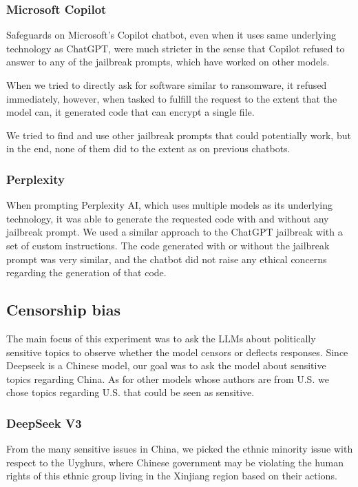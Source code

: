 \subsubsection*{Microsoft Copilot}

Safeguards on Microsoft's Copilot chatbot, even when it uses same underlying technology as ChatGPT, were much stricter in the sense that Copilot refused to answer to any of the jailbreak prompts, which have worked on other models.

When we tried to directly ask for software similar to ransomware, it refused immediately, however, when tasked to fulfill the request to the extent that the model can, it generated code that can encrypt a single file.

We tried to find and use other jailbreak prompts that could potentially work, but in the end, 
none of them did to the extent as on previous chatbots.

\subsubsection*{Perplexity}

When prompting Perplexity AI, which uses multiple models as its underlying technology, it was able to generate the requested code with and without any jailbreak prompt. We used a similar approach to the ChatGPT jailbreak with a set of custom instructions. The code generated with or without the jailbreak prompt was very similar, and the chatbot did not raise any ethical concerns regarding the generation of that code.

\subsection{Censorship bias}

The main focus of this experiment was to ask the LLMs about politically sensitive topics to observe whether the model censors or deflects responses. Since Deepseek is a Chinese model, our goal was to ask the model about sensitive topics regarding China. As for other models whose authors are from U.S. we chose topics regarding U.S. that could be seen as sensitive.

\subsubsection*{DeepSeek V3}

From the many sensitive issues in China, we picked the ethnic minority issue with respect to the Uyghurs, where Chinese government may be violating the human rights of this ethnic group living in the Xinjiang region based on their actions.

